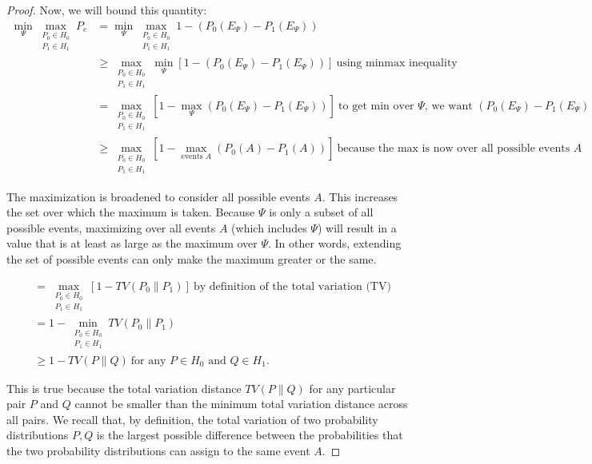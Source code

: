 \begin{proof}
Now, we will bound this quantity:
\begin{align*}
    \min _{\Psi} 
    \max _{\substack{P_0 \in H_0 \\ P_1 \in H_1}}
        P_e 
        &= 
    \min _{\Psi} 
    \max _{\substack{P_0 \in H_0 \\ P_1 \in H_1}}
        1 - (P_0(E_\Psi) - P_1(E_\Psi))
            \\
        &\geq 
        \max _{\substack{P_0 \in H_0 \\ P_1 \in H_1}}
        \min _{\Psi} 
         \left[
        1 
        - (P_0(E_\Psi) 
        -
        P_1(E_\Psi))
        \right]
        ~\text{using minmax inequality}
        \\
        &=
        \max _{\substack{P_0 \in H_0 \\ P_1 \in H_1}}
         \left[
        1 
        - \max_{\Psi} 
        (P_0(E_\Psi) 
        -
        P_1(E_\Psi))
        \right]~\text{to get min over $\Psi$, we want $(P_0(E_\Psi) -P_1(E_\Psi))$ that is largest.}
        \\
        &\geq 
        \max _{\substack{P_0 \in H_0 \\ P_1 \in H_1}}
         \left[
        1 
        - \max_{\text{events $A$}}(P_0(A) 
        -
        P_1(A))
        \right]
        ~\text{because the max is now over all possible events $A$}
    \end{align*}

The maximization is broadened to consider all possible events \( A \). This increases the set over which the maximum is taken. Because \( \Psi \) is only a subset of all possible events, maximizing over all events \( A \) (which includes \( \Psi \)) will result in a value that is at least as large as the maximum over \( \Psi \). In other words, extending the set of possible events can only make the maximum greater or the same.


\begin{align*}
        &= 
        \max _{\substack{P_0 \in H_0 \\ P_1 \in H_1}}
         \left[
        1 
        - TV(P_0 \parallel P_1)
        \right]
        ~\text{by definition of the total variation (TV)}\\
        &= 1 - \min _{\substack{P_0 \in H_0 \\ P_1 \in H_1}}TV(P_0\parallel P_1)\\
        & \geq 1 - TV(P \parallel Q) ~\text{for any $P \in H_0$ and $Q \in H_1$}.
\end{align*}

This is true because the total variation distance \( TV(P \parallel Q) \) for any particular pair \( P \) and \( Q \) cannot be smaller than the minimum total variation distance across all pairs. We recall that, by definition, the total variation of two probability distributions $P, Q$ is the largest possible difference between the probabilities that the two probability distributions can assign to the same event $A$.
\end{proof}

